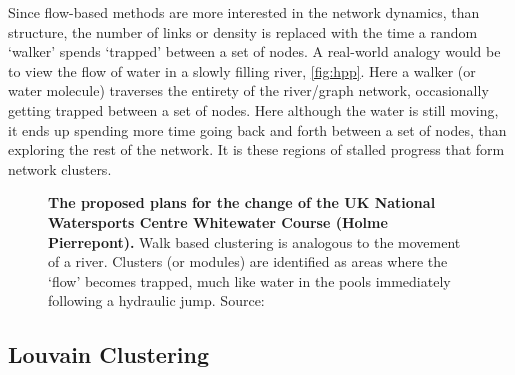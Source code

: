 Since flow-based methods are more interested in the network dynamics, than structure, the number of links or density is replaced with the time a random `walker' spends `trapped' between a set of nodes. A real-world analogy would be to view the flow of water in a slowly filling river, \autoref{fig:hpp}. Here a walker (or water molecule) traverses the entirety of the river/graph network, occasionally getting trapped between a set of nodes. Here although the water is still moving, it ends up spending more time going back and forth between a set of nodes, than exploring the rest of the network. It is these regions of stalled progress that form network clusters.

\begin{figure}[H]
    \centering
\caption{\textbf{The proposed plans for the change of the UK National Watersports Centre Whitewater Course (Holme Pierrepont).} Walk based clustering is analogous to the movement of a river. Clusters (or modules) are identified as areas where the `flow' becomes trapped, much like water in the pools immediately following a hydraulic jump. Source: \cite{hpp} }\label{fig:hpp}
\end{figure}

\subsection{Louvain Clustering}

